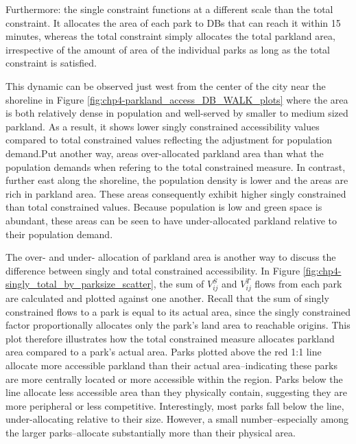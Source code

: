 \documentclass[
11pt, %
oneside, %
english, %
singlespacing, %
]{macthesis} %
\begin{document}
Furthermore: the single constraint functions at a different scale than the total constraint. It allocates the area of each park to DBs that can reach it within 15 minutes, whereas the total constraint simply allocates the total parkland area, irrespective of the amount of area of the individual parks as long as the total constraint is satisfied.

This dynamic can be observed just west from the center of the city near the shoreline in Figure \ref{fig:chp4-parkland_access_DB_WALK_plots} where the area is both relatively dense in population and well-served by smaller to medium sized parkland. As a result, it shows lower singly constrained accessibility values compared to total constrained values reflecting the adjustment for population demand.Put another way, areas over-allocated parkland area than what the population demands when refering to the total constrained measure. In contrast, further east along the shoreline, the population density is lower and the areas are rich in parkland area. These areas consequently exhibit higher singly constrained than total constrained values. Because population is low and green space is abundant, these areas can be seen to have under-allocated parkland relative to their population demand.

The over- and under- allocation of parkland area is another way to discuss the difference between singly and total constrained accessibility. In Figure \ref{fig:chp4-singly_total_by_parksize_scatter}, the sum of \(V_{ij}^S\) and \(V_{ij}^T\) flows from each park are calculated and plotted against one another. Recall that the sum of singly constrained flows to a park is equal to its actual area, since the singly constrained factor proportionally allocates only the park's land area to reachable origins. This plot therefore illustrates how the total constrained measure allocates parkland area compared to a park's actual area. Parks plotted above the red 1:1 line allocate more accessible parkland than their actual area--indicating these parks are more centrally located or more accessible within the region. Parks below the line allocate less accessible area than they physically contain, suggesting they are more peripheral or less competitive. Interestingly, most parks fall below the line, under-allocating relative to their size. However, a small number--especially among the larger parks--allocate substantially more than their physical area.
\end{document}
